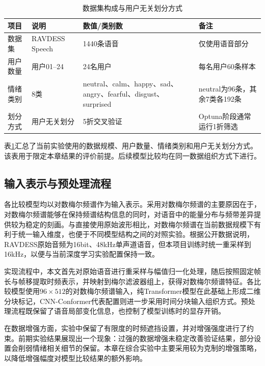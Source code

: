 \begin{table}[!htbp]
    \centering
    \caption{数据集构成与用户无关划分方式}
    \label{tab:chapter4_dataset_split}
    \small
    \setlength{\tabcolsep}{3pt}
    \renewcommand{\arraystretch}{1.05}
    \begin{tabularx}{\textwidth}{p{}p{}p{}X}
        \toprule
        项目 & 说明 & 数值/类别数 & 备注 \\
        \midrule
        数据集 & RAVDESS Speech & 1440条语音 & 仅使用语音部分 \\
        用户数量 & 用户01--24 & 24名用户 & 每名用户60条样本 \\
        情绪类别 & 8类 & neutral、calm、happy、sad、angry、fearful、disgust、surprised & neutral为96条，其余7类各192条 \\
        划分方式 & 用户无关划分 & 5折交叉验证 & Optuna阶段通常运行1折筛选 \\
        \bottomrule
    \end{tabularx}
\end{table}

表\ref{tab:chapter4_dataset_split}汇总了当前实验使用的数据规模、用户数量、情绪类别和用户无关划分方式。该表用于限定本章结果的评价前提。后续模型比较均在同一数据组织方式下进行。

\subsection{输入表示与预处理流程}

各比较模型均以对数梅尔频谱作为输入表示。采用对数梅尔频谱的主要原因在于，对数梅尔频谱能够在保持频谱结构信息的同时，对语音中的能量分布与频带差异提供较为稳定的刻画。与直接使用原始波形相比，对数梅尔频谱在当前数据规模下有利于统一输入维度，也便于不同模型结构之间的对照实验。根据公开数据说明，RAVDESS原始音频为16bit、48kHz单声道语音，但本项目训练时统一重采样到16kHz，以便与当前深度学习实验配置保持一致。

实现流程中，本文首先对原始语音进行重采样与幅值归一化处理，随后按照固定帧长与帧移提取时频表示，并映射到梅尔滤波器组上，获得对数梅尔频谱特征。各比较模型使用$96 \times 512$的对数梅尔频谱输入，纯Transformer模型在此基础上形成二维分块标记，CNN-Conformer代表配置则进一步采用时间分块输入组织方式。预处理流程既保留了语音局部变化信息，也控制了模型训练时的显存开销。

在数据增强方面，实验中保留了有限度的时频遮挡设置，并对增强强度进行了约束。前期实验结果展现出一个现象：过强的数据增强未稳定改善验证结果，部分设置会削弱情绪相关细节的保留。本章在综合实验中主要采用较为克制的增强策略，以降低增强幅度对模型比较结果的额外影响。

